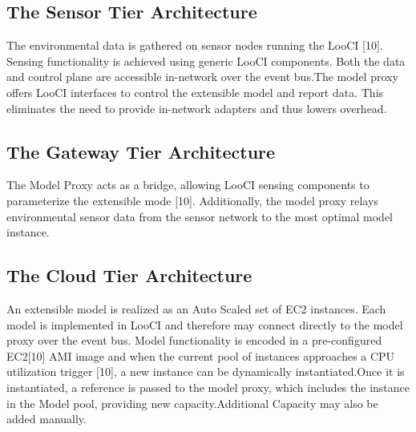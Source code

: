 \documentclass {report}
\begin{document}
\subsection{The Sensor Tier Architecture}
The environmental data is gathered on sensor nodes running the LooCI [10]. Sensing functionality is achieved using generic LooCI components. Both the data and control plane are accessible in-network
 over the event bus.The model proxy offers LooCI interfaces to control the extensible model and report data. This eliminates the need to provide in-network adapters and thus lowers overhead.\\

\subsection{The Gateway Tier Architecture }
The Model Proxy acts as a bridge, allowing LooCI sensing components to parameterize the extensible mode [10]. Additionally, the model proxy relays environmental sensor data from the sensor network to the most optimal model instance.\\ 

\subsection{The Cloud Tier Architecture }
An extensible model is realized as an Auto Scaled set of EC2 instances. Each model is implemented in LooCI and therefore may connect directly to the model proxy over the event bus. Model functionality
is encoded in a pre-configured EC2[10] AMI image and when the current pool of instances approaches a CPU utilization trigger [10], a new instance can be dynamically instantiated.Once it is instantiated, 
a reference is passed to the model proxy, which includes the instance in the Model pool, providing new capacity.Additional Capacity may also be added manually.\\
 
\end{document}
